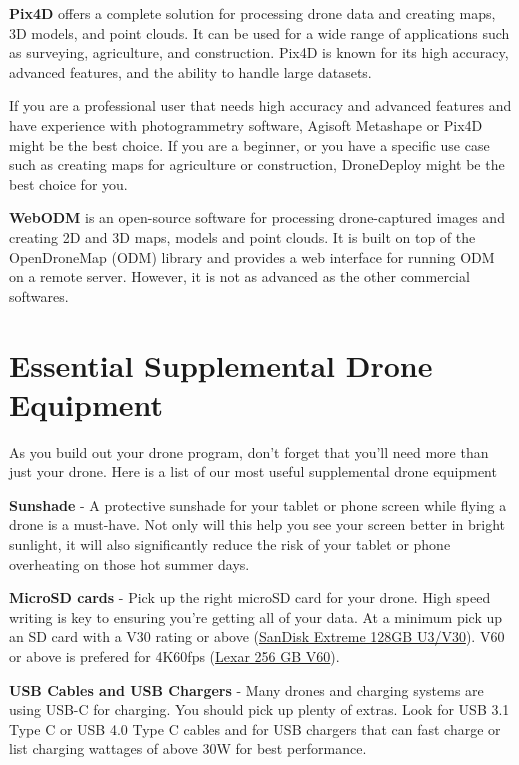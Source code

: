 \documentclass[
  12pt,
]{book}
\begin{document}
\textbf{Pix4D} offers a complete solution for processing drone data and creating maps, 3D models, and point clouds. It can be used for a wide range of applications such as surveying, agriculture, and construction. Pix4D is known for its high accuracy, advanced features, and the ability to handle large datasets.

If you are a professional user that needs high accuracy and advanced features and have experience with photogrammetry software, Agisoft Metashape or Pix4D might be the best choice. If you are a beginner, or you have a specific use case such as creating maps for agriculture or construction, DroneDeploy might be the best choice for you.

\textbf{WebODM} is an open-source software for processing drone-captured images and creating 2D and 3D maps, models and point clouds. It is built on top of the OpenDroneMap (ODM) library and provides a web interface for running ODM on a remote server. However, it is not as advanced as the other commercial softwares.

\hypertarget{essential-supplemental-drone-equipment}{%
\section{Essential Supplemental Drone Equipment}\label{essential-supplemental-drone-equipment}}

As you build out your drone program, don't forget that you'll need more than just your drone. Here is a list of our most useful supplemental drone equipment

\textbf{Sunshade} - A protective sunshade for your tablet or phone screen while flying a drone is a must-have. Not only will this help you see your screen better in bright sunlight, it will also significantly reduce the risk of your tablet or phone overheating on those hot summer days.

\textbf{MicroSD cards} - Pick up the right microSD card for your drone. High speed writing is key to ensuring you're getting all of your data. At a minimum pick up an SD card with a V30 rating or above (\href{https://www.amazon.com/SanDisk-Extreme-microSDXC-Memory-Adapter/dp/B07FCMKK5X?th=1}{SanDisk Extreme 128GB U3/V30}). V60 or above is prefered for 4K60fps (\href{https://www.amazon.com/Lexar-microSDXC-Professional-Adapter-Class10/dp/B09FJHMLC6/}{Lexar 256 GB V60}).

\textbf{USB Cables and USB Chargers} - Many drones and charging systems are using USB-C for charging. You should pick up plenty of extras. Look for USB 3.1 Type C or USB 4.0 Type C cables and for USB chargers that can fast charge or list charging wattages of above 30W for best performance.
\end{document}
